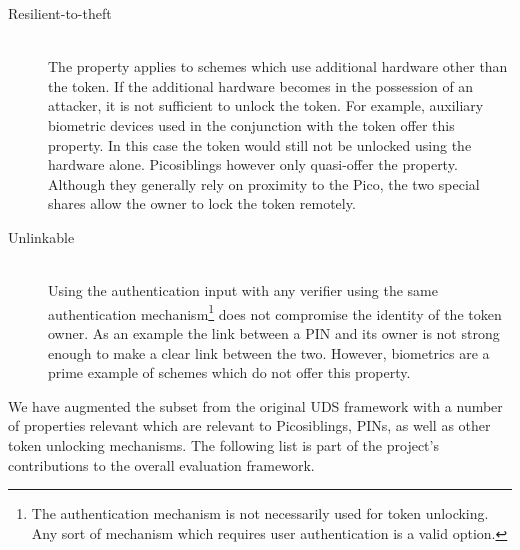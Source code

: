 \begin{description}
  \item[Resilient-to-theft] \hfill \\
  The property applies to schemes which use additional hardware other than the token. If the additional hardware becomes in the possession of an attacker, it is not sufficient to unlock the token. For example, auxiliary biometric devices used in the conjunction with the token offer this property. In this case the token would still not be unlocked using the hardware alone. Picosiblings however only quasi-offer the property. Although they generally rely on proximity to the Pico, the two special shares allow the owner to lock the token remotely.
  
  \item[Unlinkable] \hfill \\
  Using the authentication input with any verifier using the same authentication mechanism\footnote{The authentication mechanism is not necessarily used for token unlocking. Any sort of mechanism which requires user authentication is a valid option.} does not compromise the identity of the token owner. As an example the link between a PIN and its owner is not strong enough to make a clear link between the two. However, biometrics are a prime example of schemes which do not offer this property.
  
\end{description}

We have augmented the subset from the original UDS framework with a number of properties relevant which are relevant to Picosiblings, PINs, as well as other token unlocking mechanisms. The following list is part of the project's contributions to the overall evaluation framework.

